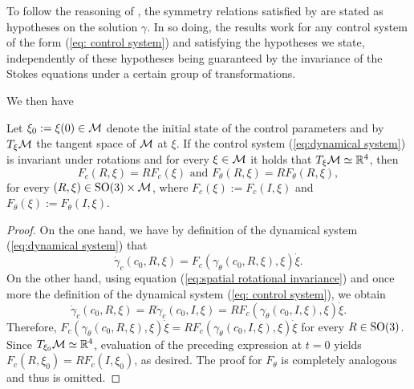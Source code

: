 \begin{remark}
To follow the reasoning of \cite{Alouges2017}, the symmetry relations satisfied by \spr are stated as hypotheses on the solution $\gamma$. In so doing, the results work for any control system of the form (\ref{eq: control system}) and satisfying the hypotheses we state, independently of these hypotheses being guaranteed by the invariance of the Stokes equations under a certain group of transformations. 
\end{remark}
We then have
\begin{proposition}
\label{prop: rotational invariance}
Let $\xi_0 := \xi(0) \in \mathcal{M}$ denote the initial state of the control parameters and by $T_{\xi}\mathcal{M}$ the tangent space of $\mathcal{M}$ at $\xi$. If the control system (\ref{eq:dynamical system}) is invariant under rotations and for every $\xi \in \mathcal{M}$ it holds that $T_{\xi} \mathcal{M} \simeq \mathbb{R}^4$, then
\begin{equation}
	F_c(R, \xi) = R F_c(\xi) \text { and } F_\theta(R, \xi) = R F_{\theta} (R, \xi),
\end{equation}
for every $(R, \xi) \in \operatorname{SO}(3) \times \mathcal{M}$, where $F_c(\xi) := F_{c}(I, \xi)$ and $F_{\theta}(\xi) := F_{\theta}(I, \xi)$. 
\end{proposition}

\begin{proof}
On the one hand, we have by definition of the dynamical system (\ref{eq:dynamical system}) that
\begin{equation}
	\dot{\gamma}_c(c_0, R, \xi) = F_c(\gamma_{\theta}(c_0, R, \xi), \xi) \dot{\xi}.
\end{equation}
On the other hand, using equation (\ref{eq:spatial rotational invariance}) and once more the definition of the dynamical system (\ref{eq: control system}), we obtain
\begin{equation}
	\dot{\gamma}_c (c_0, R, \xi) = R  \dot{\gamma}_c(c_0, I, \xi) = 
	R F_c(\gamma_{\theta}(c_0, I, \xi), \xi) \dot{\xi}.
\end{equation}
Therefore, $F_c(\gamma_{\theta}(c_0, R, \xi), \xi) \dot{\xi} = R F_{c}(\gamma_{\theta}(c_0, I, \xi), \xi) \dot{\xi}$ for every $R \in \operatorname{SO}(3)$. Since $T_{\xi_0} \mathcal{M} \simeq \mathbb{R}^4$, evaluation of the preceding expression at $t = 0$ yields $F_{c}(R, \xi_0) = R F_{c}(I, \xi_0)$, as desired. The proof for $F_{\theta}$ is completely analogous and thus is omitted.
\end{proof}
